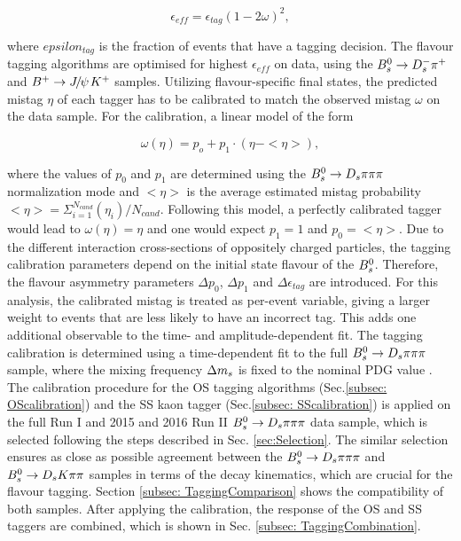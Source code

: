 \begin{equation}
\label{eq: taggingEfficiency}
\epsilon_{eff} = \epsilon_{tag}(1 - 2\omega)^{2},
\end{equation}

where $epsilon_{tag}$ is the fraction of events that have a tagging decision. 
The flavour tagging algorithms are optimised for highest $\epsilon_{eff}$ on data, using the ${{B}^0_{s}}\rightarrow{\ensuremath{{D}^-_{s}}}{\ensuremath{{\pi}^+}}$ and ${{B}^+}\rightarrow{\ensuremath{{J\mskip -3mu/\mskip -2mu\psi\mskip 2mu}}}{\ensuremath{{K}^+}}$ samples. \newline
Utilizing flavour-specific final states, the predicted mistag $\eta$ of each tagger has to be calibrated to match the observed mistag $\omega$ on the data sample. 
For the calibration, a linear model of the form

\begin{equation}
\label{eq: mistagCalibration}
\omega(\eta) = p_{o} + p_{1} \cdot (\eta - < \eta >), 
\end{equation}  

where the values of $p_{0}$ and $p_{1}$ are determined using the ${{B}^0_{s}}\rightarrow{\ensuremath{{D}_{s}}}{\ensuremath{\pi}}{\ensuremath{\pi}}{\ensuremath{\pi}}$ normalization mode and $<\eta>$ is the average estimated mistag probability $<\eta> = \Sigma_{i=1}^{N_{cand}}(\eta_{i}) / N_{cand}$.
Following this model, a perfectly calibrated tagger would lead to $\omega(\eta) = \eta$ and one would expect $p_{1} = 1$ and $p_{0} = <\eta>$.
Due to the different interaction cross-sections of oppositely charged particles, the tagging calibration parameters depend on the initial state flavour of the ${{B}^0_{s}}$. 
Therefore, the flavour asymmetry parameters $\Delta p_{0}$, $\Delta p_{1}$ and $\Delta\epsilon_{tag}$ are introduced. 
For this analysis, the calibrated mistag is treated as per-event variable, giving a larger weight to events that are less likely to have an incorrect tag. 
This adds one additional observable to the time- and amplitude-dependent fit. \newline
The tagging calibration is determined using a time-dependent fit to the full ${{B}^0_{s}}\rightarrow{\ensuremath{{D}_{s}}}{\ensuremath{\pi}}{\ensuremath{\pi}}{\ensuremath{\pi}}$ sample, where the mixing frequency ${\Delta m_{{s}}}$ is fixed to the nominal PDG value \cite{PDG2014}.
The calibration procedure for the OS tagging algorithms (Sec.\ref{subsec: OScalibration}) and 
the SS kaon tagger (Sec.\ref{subsec: SScalibration}) is applied on the full Run I and 2015 and 2016 Run II ${{B}^0_{s}}\rightarrow{\ensuremath{{D}_{s}}}{\ensuremath{\pi}}{\ensuremath{\pi}}{\ensuremath{\pi}}$ data sample, which is selected following the steps described in Sec. \ref{sec:Selection}.
The similar selection ensures as close as possible agreement between the ${{B}^0_{s}}\rightarrow{\ensuremath{{D}_{s}}}{\ensuremath{\pi}}{\ensuremath{\pi}}{\ensuremath{\pi}}$ and ${{B}^0_{s}}\rightarrow{\ensuremath{{D}_{s}}}{\ensuremath{K}}{\ensuremath{\pi}}{\ensuremath{\pi}}$ samples in terms of the decay kinematics, which are crucial for the flavour tagging.
Section \ref{subsec: TaggingComparison} shows the compatibility of both samples. After applying the calibration, the response of the OS and SS taggers are combined, which is shown in Sec. \ref{subsec: TaggingCombination}.  





